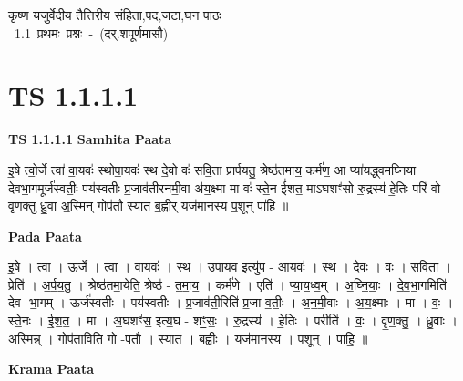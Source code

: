 \documentclass[17pt]{extarticle}
\begin{document}
\begin{titlepage}
    \begin{center}
 
\begin{sanskrit}
    { \Huge
    कृष्ण यजुर्वेदीय तैत्तिरीय संहिता,पद,जटा,घन पाठः 
    }
    \\
    \vspace{2.5cm}
    \mbox{ \Huge
    1.1     प्रथमः प्रश्नः - (दर्.शपूर्णमासौ)   }
\end{sanskrit}
\end{center}

\end{titlepage}
\tableofcontents
\pagebreak

\section*{ TS 1.1.1.1 }

\textbf{TS 1.1.1.1 } \newline
\textbf{Samhita Paata} \newline

इ॒षे त्वो॒र्जे त्वा॑ वा॒यवः॑ स्थोपा॒यवः॑ स्थ दे॒वो वः॑ सवि॒ता प्रार्प॑यतु॒ श्रेष्ठ॑तमाय॒ कर्म॑ण॒ आ प्या॑यद्ध्वमघ्निया देवभा॒गमूर्ज॑स्वतीः॒ पय॑स्वतीः प्र॒जाव॑तीरनमी॒वा अ॑य॒क्ष्मा मा वः॑ स्ते॒न ई॑शत॒ माऽघशꣳ॑सो रु॒द्रस्य॑ हे॒तिः परि॑ वो वृणक्तु ध्रु॒वा अ॒स्मिन् गोप॑तौ स्यात ब॒ह्वीर् यज॑मानस्य प॒शून् पा॑हि ॥ \newline

\textbf{Pada Paata} \newline

इ॒षे । त्वा॒ । ऊ॒र्जे । त्वा॒ । वा॒यवः॑ । स्थ॒ । उ॒पा॒यव॒ इत्यु॑प - आ॒यवः॑ । स्थ॒ । दे॒वः । वः॒ । स॒वि॒ता । प्रेति॑ । अ॒र्प॒य॒तु॒ । श्रेष्ठ॑तमा॒येति॒ श्रेष्ठ॑ - त॒मा॒य॒ । कर्म॑णे । एति॑ । प्या॒य॒ध्व॒म् । अ॒घ्नि॒याः॒ । दे॒व॒भा॒गमिति॑ देव- भा॒गम् । ऊर्ज॑स्वतीः । पय॑स्वतीः । प्र॒जाव॑ती॒रिति॑ प्र॒जा-व॒तीः॒ । अ॒न॒मी॒वाः । अ॒य॒क्ष्माः । मा । वः॒ । स्ते॒नः । ई॒श॒त॒ । मा । अ॒घशꣳ॑स॒ इत्य॒घ - शꣳ॒॒सः॒ । रु॒द्रस्य॑ । हे॒तिः । परीति॑ । वः॒ । वृ॒ण॒क्तु॒ । ध्रु॒वाः । अ॒स्मिन्न् । गोप॑ता॒विति॒ गो -प॒तौ॒ । स्या॒त॒ । ब॒ह्वीः । यज॑मानस्य । प॒शून् । पा॒हि॒ ॥  \newline


\textbf{Krama Paata} \newline
\end{document}

